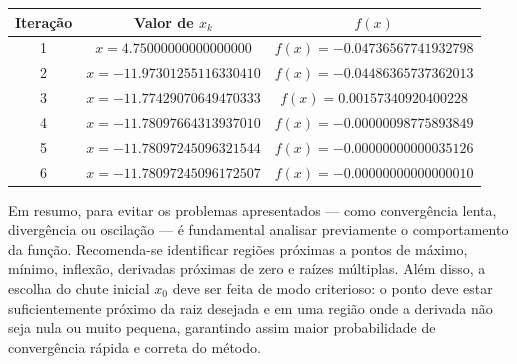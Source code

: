 \begin{center}
\small
\begin{tabular}{|c|c|c|}
\hline
Iteração & Valor de $x_k$ & $f(x)$ \\
\hline
1 & $x = 4.75000000000000000$ & $f(x) = -0.04736567741932798$ \\
\hline
2 & $x = -11.97301255116330410$ & $f(x) = -0.04486365737362013$ \\
\hline
3 & $x = -11.77429070649470333$ & $f(x) = 0.00157340920400228$ \\
\hline
4 & $x = -11.78097664313937010$ & $f(x) = -0.00000098775893849$ \\
\hline
5 & $x = -11.78097245096321544$ & $f(x) = -0.00000000000035126$ \\
\hline
6 & $x = -11.78097245096172507$ & $f(x) = -0.00000000000000010$ \\
\hline
\end{tabular}
\label{tab:ciladaNR}
\end{center}
Em resumo, para evitar os problemas apresentados — como convergência lenta, divergência ou oscilação — é fundamental analisar previamente o comportamento da função. Recomenda-se identificar regiões próximas a pontos de máximo, mínimo, inflexão, derivadas próximas de zero e raízes múltiplas. Além disso, a escolha do chute inicial $x_0$ deve ser feita de modo criterioso: o ponto deve estar suficientemente próximo da raiz desejada e em uma região onde a derivada não seja nula ou muito pequena, garantindo assim maior probabilidade de convergência rápida e correta do método.

